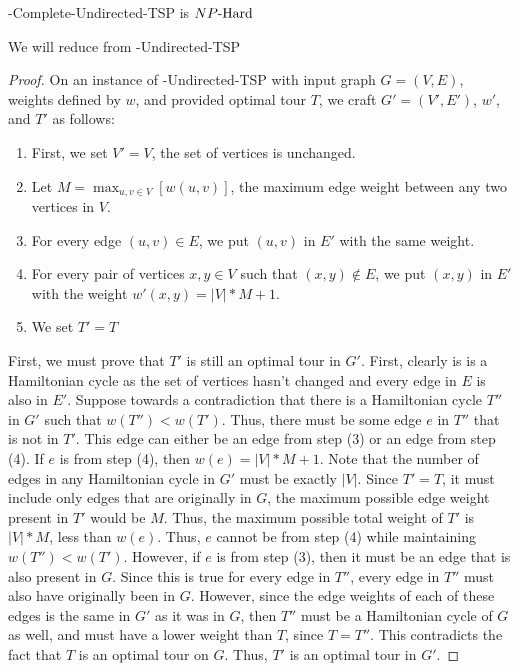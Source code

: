\begin{lemma*}
    \inob{}-Complete-Undirected-TSP is ${NP\text{-Hard{}}}$
\end{lemma*}
We will reduce from \inob{}-Undirected-TSP 
\begin{proof}
    On an instance of \inob{}-Undirected-TSP with input graph $G = (V,E)$, weights defined by $w$, and provided optimal tour $T$, we craft $G' = (V',E')$, $w'$, and $T'$ as follows:
    \begin{enumerate}
        \item First, we set $V' = V$, the set of vertices is unchanged.
        \item Let $M = \max_{u,v\in V}[w(u,v)]$, the maximum edge weight between any two vertices in $V$.
        \item For every edge $(u,v)\in E$, we put $(u,v)$ in $E'$ with the same weight.
        \item For every pair of vertices $x,y \in V$ such that $(x,y) \not \in E$, we put $(x,y)$ in $E'$ with the weight $w'(x,y) = |V| * M + 1$.
        \item We set $T' = T$
    \end{enumerate}

    First, we must prove that $T'$ is still an optimal tour in $G'$. First, clearly is is a Hamiltonian cycle as the set of vertices hasn't changed and every edge in $E$ is also in $E'$. Suppose towards a contradiction that there is a Hamiltonian cycle $T''$ in $G'$ such that $w(T'') < w(T')$. Thus, there must be some edge $e$ in $T''$ that is not in $T'$. This edge can either be an edge from step (3) or an edge from step (4). If $e$ is from step (4), then $w(e) = |V| * M + 1$. Note that the number of edges in any Hamiltonian cycle in $G'$ must be exactly $|V|$. Since $T' = T$, it must include only edges that are originally in $G$, the maximum possible edge weight present in $T'$ would be $M$. Thus, the maximum possible total weight of $T'$ is $|V|*M$, less than $w(e)$. Thus, $e$ cannot be from step (4) while maintaining $w(T'') < w(T') $. However, if $e$ is from step (3), then it must be an edge that is also present in $G$. Since this is true for every edge in $T''$, every edge in $T''$ must also have originally been in $G$. However, since the edge weights of each of these edges is the same in $G'$ as it was in $G$, then $T''$ must be a Hamiltonian cycle of $G$ as well, and must have a lower weight than $T$, since $T = T''$. This contradicts the fact that $T$ is an optimal tour on $G$. Thus, $T'$ is an optimal tour in $G'$.


\end{proof}
